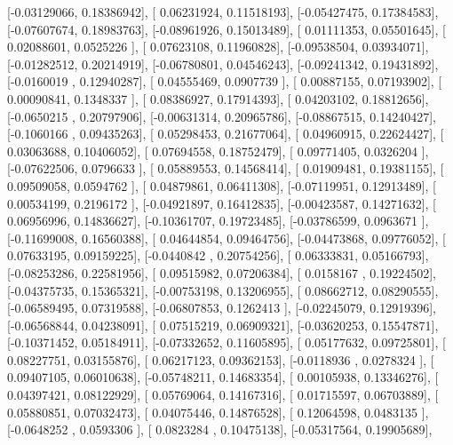 \documentclass{article}
\begin{document}
       [-0.03129066,  0.18386942],
       [ 0.06231924,  0.11518193],
       [-0.05427475,  0.17384583],
       [-0.07607674,  0.18983763],
       [-0.08961926,  0.15013489],
       [ 0.01111353,  0.05501645],
       [ 0.02088601,  0.0525226 ],
       [ 0.07623108,  0.11960828],
       [-0.09538504,  0.03934071],
       [-0.01282512,  0.20214919],
       [-0.06780801,  0.04546243],
       [-0.09241342,  0.19431892],
       [-0.0160019 ,  0.12940287],
       [ 0.04555469,  0.0907739 ],
       [ 0.00887155,  0.07193902],
       [ 0.00090841,  0.1348337 ],
       [ 0.08386927,  0.17914393],
       [ 0.04203102,  0.18812656],
       [-0.0650215 ,  0.20797906],
       [-0.00631314,  0.20965786],
       [-0.08867515,  0.14240427],
       [-0.1060166 ,  0.09435263],
       [ 0.05298453,  0.21677064],
       [ 0.04960915,  0.22624427],
       [ 0.03063688,  0.10406052],
       [ 0.07694558,  0.18752479],
       [ 0.09771405,  0.0326204 ],
       [-0.07622506,  0.0796633 ],
       [ 0.05889553,  0.14568414],
       [ 0.01909481,  0.19381155],
       [ 0.09509058,  0.0594762 ],
       [ 0.04879861,  0.06411308],
       [-0.07119951,  0.12913489],
       [ 0.00534199,  0.2196172 ],
       [-0.04921897,  0.16412835],
       [-0.00423587,  0.14271632],
       [ 0.06956996,  0.14836627],
       [-0.10361707,  0.19723485],
       [-0.03786599,  0.0963671 ],
       [-0.11699008,  0.16560388],
       [ 0.04644854,  0.09464756],
       [-0.04473868,  0.09776052],
       [ 0.07633195,  0.09159225],
       [-0.0440842 ,  0.20754256],
       [ 0.06333831,  0.05166793],
       [-0.08253286,  0.22581956],
       [ 0.09515982,  0.07206384],
       [ 0.0158167 ,  0.19224502],
       [-0.04375735,  0.15365321],
       [-0.00753198,  0.13206955],
       [ 0.08662712,  0.08290555],
       [-0.06589495,  0.07319588],
       [-0.06807853,  0.1262413 ],
       [-0.02245079,  0.12919396],
       [-0.06568844,  0.04238091],
       [ 0.07515219,  0.06909321],
       [-0.03620253,  0.15547871],
       [-0.10371452,  0.05184911],
       [-0.07332652,  0.11605895],
       [ 0.05177632,  0.09725801],
       [ 0.08227751,  0.03155876],
       [ 0.06217123,  0.09362153],
       [-0.0118936 ,  0.0278324 ],
       [ 0.09407105,  0.06010638],
       [-0.05748211,  0.14683354],
       [ 0.00105938,  0.13346276],
       [ 0.04397421,  0.08122929],
       [ 0.05769064,  0.14167316],
       [ 0.01715597,  0.06703889],
       [ 0.05880851,  0.07032473],
       [ 0.04075446,  0.14876528],
       [ 0.12064598,  0.0483135 ],
       [-0.0648252 ,  0.0593306 ],
       [ 0.0823284 ,  0.10475138],
       [-0.05317564,  0.19905689],
\end{document}
